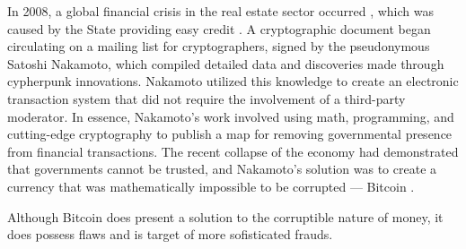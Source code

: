 In 2008, a global financial crisis in the real estate sector occurred \cite{bordo2008historical}, which was caused by
the State providing easy credit \cite{murphy2008analysis}. A cryptographic document began circulating on a mailing list
for cryptographers, signed by the pseudonymous Satoshi Nakamoto, which compiled detailed data and discoveries made
through cypherpunk innovations. Nakamoto utilized this knowledge to create an electronic transaction system that did not
require the involvement of a third-party moderator. In essence, Nakamoto's work involved using math, programming, and
cutting-edge cryptography to publish a map for removing governmental presence from financial transactions. The recent
collapse of the economy had demonstrated that governments cannot be trusted, and Nakamoto's solution was to create a
currency that was mathematically impossible to be corrupted --- Bitcoin \cite{nakamoto2008bitcoin}.

Although Bitcoin does present a solution to the corruptible nature of money, it does possess flaws and is target of more
sofisticated frauds.